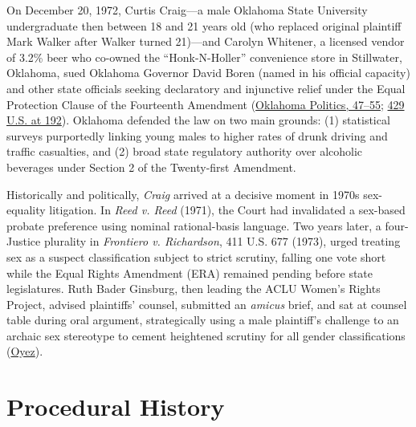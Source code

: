 \documentclass[12pt]{article}
\begin{document}
On December 20, 1972, Curtis Craig---a male Oklahoma State University undergraduate then between 18 and 21 years old (who replaced original plaintiff Mark Walker after Walker turned 21)---and Carolyn Whitener, a licensed vendor of 3.2\% beer who co-owned the ``Honk-N-Holler'' convenience store in Stillwater, Oklahoma, sued Oklahoma Governor David Boren (named in his official capacity) and other state officials seeking declaratory and injunctive relief under the Equal Protection Clause of the Fourteenth Amendment (\href{https://ojs.library.okstate.edu/osu/index.php/OKPolitics/article/view/930/832}{Oklahoma Politics, 47--55}; \href{https://supreme.justia.com/cases/federal/us/429/190/}{429 U.S. at 192}). Oklahoma defended the law on two main grounds: (1) statistical surveys purportedly linking young males to higher rates of drunk driving and traffic casualties, and (2) broad state regulatory authority over alcoholic beverages under Section 2 of the Twenty-first Amendment.

Historically and politically, \textit{Craig} arrived at a decisive moment in 1970s sex-equality litigation. In \textit{Reed v. Reed} (1971), the Court had invalidated a sex-based probate preference using nominal rational-basis language. Two years later, a four-Justice plurality in \textit{Frontiero v. Richardson}, 411 U.S. 677 (1973), urged treating sex as a suspect classification subject to strict scrutiny, falling one vote short while the Equal Rights Amendment (ERA) remained pending before state legislatures. Ruth Bader Ginsburg, then leading the ACLU Women's Rights Project, advised plaintiffs' counsel, submitted an \textit{amicus} brief, and sat at counsel table during oral argument, strategically using a male plaintiff's challenge to an archaic sex stereotype to cement heightened scrutiny for all gender classifications (\href{https://www.oyez.org/cases/1976/75-628}{Oyez}).

\section{Procedural History}
\end{document}
